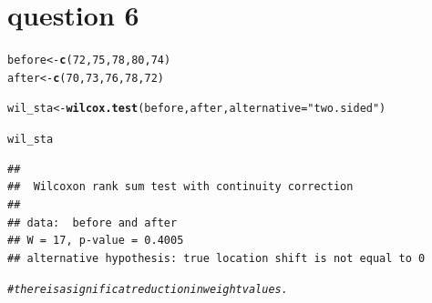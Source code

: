 \documentclass{article}\usepackage[]{graphicx}\usepackage[]{xcolor}
\makeatletter
\newcommand{\hlnum}[1]{\textcolor[rgb]{0.686,0.059,0.569}{#1}}%
\newcommand{\hlsng}[1]{\textcolor[rgb]{0.192,0.494,0.8}{#1}}%
\newcommand{\hlcom}[1]{\textcolor[rgb]{0.678,0.584,0.686}{\textit{#1}}}%
\newcommand{\hldef}[1]{\textcolor[rgb]{0.345,0.345,0.345}{#1}}%
\newcommand{\hlkwb}[1]{\textcolor[rgb]{0.69,0.353,0.396}{#1}}%
\newcommand{\hlkwc}[1]{\textcolor[rgb]{0.333,0.667,0.333}{#1}}%
\newcommand{\hlkwd}[1]{\textcolor[rgb]{0.737,0.353,0.396}{\textbf{#1}}}%
\newenvironment{kframe}{%
 \def\at@end@of@kframe{}%
 \ifinner\ifhmode%
  \def\at@end@of@kframe{\end{minipage}}%
  \begin{minipage}{\columnwidth}%
 \fi\fi%
 \def\FrameCommand##1{\hskip\@totalleftmargin \hskip-\fboxsep
 \colorbox{shadecolor}{##1}\hskip-\fboxsep
     \hskip-\linewidth \hskip-\@totalleftmargin \hskip\columnwidth}%
 \MakeFramed {\advance\hsize-\width
   \@totalleftmargin\z@ \linewidth\hsize
   \@setminipage}}%
 {\par\unskip\endMakeFramed%
 \at@end@of@kframe}
\newenvironment{knitrout}{}{} %
\makeatother
\begin{document}
\section{question 6}
\begin{knitrout}
\color{fgcolor}\begin{kframe}
\begin{alltt}
\hldef{before} \hlkwb{<-} \hlkwd{c}\hldef{(}\hlnum{72}\hldef{,} \hlnum{75}\hldef{,} \hlnum{78}\hldef{,} \hlnum{80}\hldef{,} \hlnum{74}\hldef{)}
\hldef{after} \hlkwb{<-} \hlkwd{c}\hldef{(}\hlnum{70}\hldef{,} \hlnum{73}\hldef{,} \hlnum{76}\hldef{,} \hlnum{78}\hldef{,} \hlnum{72}\hldef{)}

\hldef{wil_sta} \hlkwb{<-} \hlkwd{wilcox.test}\hldef{(before, after,} \hlkwc{alternative}\hldef{=}\hlsng{"two.sided"}\hldef{)}
\end{alltt}


{\ttfamily\noindent{}}\begin{alltt}
\hldef{wil_sta}
\end{alltt}
\begin{verbatim}
## 
## 	Wilcoxon rank sum test with continuity correction
## 
## data:  before and after
## W = 17, p-value = 0.4005
## alternative hypothesis: true location shift is not equal to 0
\end{verbatim}
\begin{alltt}
\hlcom{#there is a significat reduction in weight values.}
\end{alltt}
\end{kframe}
\end{knitrout}
\end{document}
